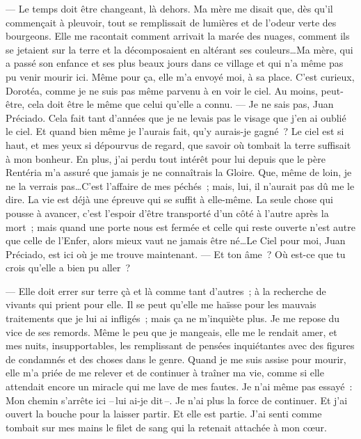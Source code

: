   --- Le temps doit être changeant, là dehors. Ma mère me disait que, dès qu’il commençait à pleuvoir, tout se remplissait de lumières et de l’odeur verte des bourgeons. Elle me racontait comment arrivait la marée des nuages, comment ils se jetaient sur la terre et la décomposaient en altérant ses couleurs\ldots Ma mère, qui a passé son enfance et ses plus beaux jours dans ce village et qui n’a même pas pu venir mourir ici. Même pour ça, elle m’a envoyé moi, à sa place. C’est curieux, Dorotéa, comme je ne suis pas même parvenu à en voir le ciel. Au moins, peut-être, cela doit être le même que celui qu’elle a connu.
\pend
%
\pstart
  --- Je ne sais pas, Juan Préciado. Cela fait tant d’années que je ne levais pas le visage que j’en ai oublié le ciel. Et quand bien même je l'aurais fait, qu’y aurais-je gagné ? Le ciel est si haut, et mes yeux si dépourvus de regard, que savoir où tombait la terre suffisait à mon bonheur. En plus, j’ai perdu tout intérêt pour lui depuis que le père Rentéria m’a assuré que jamais je ne connaîtrais la Gloire. Que, même de loin, je ne la verrais pas\ldots C’est l’affaire de mes péchés ; mais, lui, il n’aurait pas dû me le dire. La vie est déjà une épreuve qui se suffit à elle-même. La seule chose qui pousse à avancer, c’est l’espoir d’être transporté d’un côté à l’autre après la mort ; mais quand une porte nous est fermée et celle qui reste ouverte n'est autre que celle de l'Enfer, alors mieux vaut ne jamais être né\ldots Le Ciel pour moi, Juan Préciado, est ici où je me trouve maintenant.
\pend
%
\pstart
  --- Et ton âme ? Où est-ce que tu crois qu’elle a bien pu aller ?

  --- Elle doit errer sur terre çà et là comme tant d’autres ; à la recherche de vivants qui prient pour elle. Il se peut qu’elle me haïsse pour les mauvais traitements que je lui ai infligés ; mais ça ne m’inquiète plus. Je me repose du vice de ses remords. Même le peu que je mangeais, elle me le rendait amer, et mes nuits, insupportables, les remplissant de pensées inquiétantes avec des figures de condamnés et des choses dans le genre. Quand je me suis assise pour mourir, elle m’a priée de me relever et de continuer à traîner ma vie, comme si elle attendait encore un miracle qui me lave de mes fautes. Je n’ai même pas essayé : \og{}Mon chemin s’arrête ici --\,lui ai-je dit\,--. Je n'ai plus la force de continuer.\fg{} Et j’ai ouvert la bouche pour la laisser partir. Et elle est partie. J’ai senti comme tombait sur mes mains le filet de sang qui la retenait attachée à mon cœur. %
\pend
